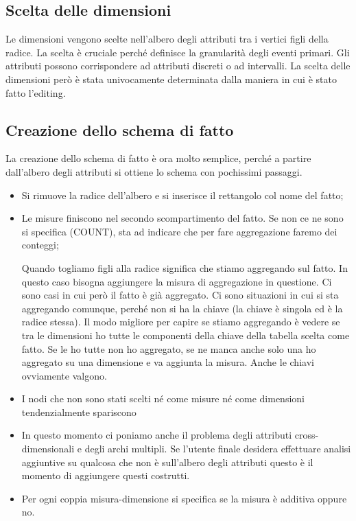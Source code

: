 \subsection{Scelta delle dimensioni}
Le dimensioni vengono scelte nell'albero degli attributi tra i vertici figli della radice. La scelta è cruciale perché definisce la granularità degli eventi primari. Gli attributi possono corrispondere ad attributi discreti o ad intervalli. La scelta delle dimensioni però è stata univocamente determinata dalla maniera in cui è stato fatto l'editing.
\subsection{Creazione dello schema di fatto}
La creazione dello schema di fatto è ora molto semplice, perché a partire dall'albero degli attributi si ottiene lo schema con pochissimi passaggi.
\begin{itemize}
	\item Si rimuove la radice dell'albero e si inserisce il rettangolo col nome del fatto;
	\item Le misure finiscono nel secondo scompartimento del fatto. Se non ce ne sono si specifica (COUNT), sta ad indicare che per fare aggregazione faremo dei conteggi;
	\begin{warn}
		Quando togliamo figli alla radice significa che stiamo aggregando sul fatto. In questo caso bisogna aggiungere la misura di aggregazione in questione. Ci sono casi in cui però il fatto è già aggregato. Ci sono situazioni in cui si sta aggregando comunque, perché non si ha la chiave (la chiave è singola ed è la radice stessa). Il modo migliore per capire se stiamo aggregando è vedere se tra le dimensioni ho tutte le componenti della chiave della tabella scelta come fatto. Se le ho tutte non ho aggregato, se ne manca anche solo una ho aggregato su una dimensione e va aggiunta la misura. Anche le chiavi ovviamente valgono.
	\end{warn}
	\item I nodi che non sono stati scelti né come misure né come dimensioni tendenzialmente spariscono
	\item In questo momento ci poniamo anche il problema degli attributi cross-dimensionali e degli archi multipli. Se l'utente finale desidera effettuare analisi aggiuntive su qualcosa che non è sull'albero degli attributi questo è il momento di aggiungere questi costrutti.
	\item Per ogni coppia misura-dimensione si specifica se la misura è additiva oppure no.
\end{itemize}
